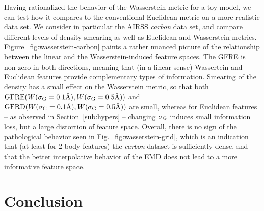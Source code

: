 Having rationalized the behavior of the Wasserstein metric for a toy model, we can test how it compares to the conventional Euclidean metric on a more realistic data set. We consider in particular the AIRSS \emph{carbon} data set, and compare different levels of density smearing as well as Euclidean and Wasserstein metrics. 
Figure~\ref{fig:wasserstein-carbon} paints a rather nuanced picture of the relationship between the linear and the Wasserstein-induced feature spaces. 
The GFRE is non-zero in both directions, meaning that (in a linear sense) Wassertein and Euclidean features provide complementary types of information. 
Smearing of the density has a small effect on the Wasserstein metric, so that both $\operatorname{GFRE}(W(\sigma_\text{G}=0.1\text{\AA}),W(\sigma_\text{G}=0.5\text{\AA}))$ and $\operatorname{GFRD}(W(\sigma_\text{G}=0.1\text{\AA}),W(\sigma_\text{G}=0.5\text{\AA}))$ are small, whereas for Euclidean features -- as observed in Section~\ref{sub:hypers} -- changing $\sigma_\text{G}$ induces small information loss, but a large distortion of feature space. 
Overall, there is no sign of the pathological behavior seen in Fig.~\ref{fig:wasserstein-grid}, which is an indication that (at least for 2-body features) the \emph{carbon} dataset is sufficiently dense, and that the better interpolative behavior of the EMD does not lead to a more informative feature space. 




\section{Conclusion}

